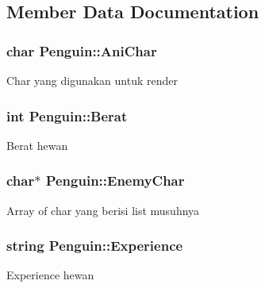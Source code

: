 \subsection{Member Data Documentation}
\subsubsection[{\texorpdfstring{Ani\+Char}{AniChar}}]{\setlength{\rightskip}{0pt plus 5cm}char Penguin\+::\+Ani\+Char\hspace{0.3cm}{\ttfamily [protected]}}\hypertarget{class_penguin_a501f89a2f9826a5308e15b655e6ea70d}{}\label{class_penguin_a501f89a2f9826a5308e15b655e6ea70d}
Char yang digunakan untuk render 
\subsubsection[{\texorpdfstring{Berat}{Berat}}]{\setlength{\rightskip}{0pt plus 5cm}int Penguin\+::\+Berat\hspace{0.3cm}{\ttfamily [protected]}}\hypertarget{class_penguin_a4c59405dfc8568121b2ff44e0a753bf0}{}\label{class_penguin_a4c59405dfc8568121b2ff44e0a753bf0}
Berat hewan 
\subsubsection[{\texorpdfstring{Enemy\+Char}{EnemyChar}}]{\setlength{\rightskip}{0pt plus 5cm}char$\ast$ Penguin\+::\+Enemy\+Char\hspace{0.3cm}{\ttfamily [protected]}}\hypertarget{class_penguin_a8fd2d31987c3ce517ff51dd602cd0ce8}{}\label{class_penguin_a8fd2d31987c3ce517ff51dd602cd0ce8}
Array of char yang berisi list musuhnya 
\subsubsection[{\texorpdfstring{Experience}{Experience}}]{\setlength{\rightskip}{0pt plus 5cm}string Penguin\+::\+Experience\hspace{0.3cm}{\ttfamily [protected]}}\hypertarget{class_penguin_a19dfeca672ed3b19c79b9b764526451d}{}\label{class_penguin_a19dfeca672ed3b19c79b9b764526451d}
Experience hewan 
